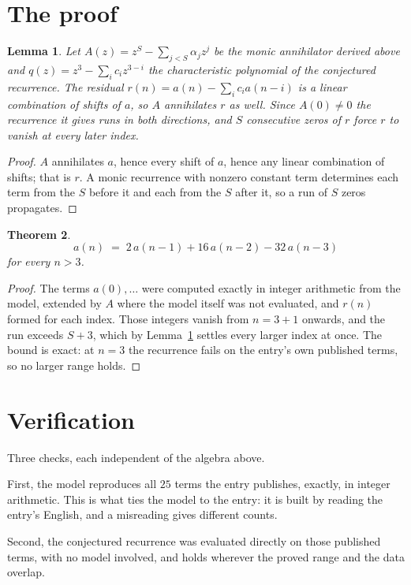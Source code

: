 \documentclass[11pt,a4paper]{article}
\theoremstyle{plain}
\newtheorem{theorem}{Theorem}
\newtheorem{lemma}[theorem]{Lemma}
\theoremstyle{definition}
\begin{document}
\section{The proof}

\begin{lemma}\label{lem:crit}
Let $A(z)=z^S-\sum_{j<S}\alpha_jz^{j}$ be the monic annihilator derived above and
$q(z)=z^{3}-\sum_ic_iz^{3-i}$ the characteristic polynomial of the conjectured
recurrence. The residual $r(n)=a(n)-\sum_ic_ia(n-i)$ is a linear combination of shifts of $a$,
so $A$ annihilates $r$ as well. Since $A(0)\ne0$ the recurrence it gives runs in both
directions, and $S$ consecutive zeros of $r$ force $r$ to vanish at every later index.
\end{lemma}

\begin{proof}
$A$ annihilates $a$, hence every shift of $a$, hence any linear combination of shifts; that is
$r$. A monic recurrence with nonzero constant term determines each term from the $S$ before it
and each from the $S$ after it, so a run of $S$ zeros propagates.
\end{proof}

\begin{theorem}
\[
a(n)\;=\;2\,a(n-1) + 16\,a(n-2) - 32\,a(n-3)
\]
for every $n>3$.
\end{theorem}

\begin{proof}
The terms $a(0),\dots$ were computed exactly in integer arithmetic from the model, extended by
$A$ where the model itself was not evaluated, and $r(n)$ formed for each index. Those integers
vanish from $n=3+1$ onwards, and the run exceeds $S+3$, which by
Lemma~\ref{lem:crit} settles every larger index at once. The bound is exact: at $n=3$ the recurrence fails on the entry's own published terms, so no larger range holds.
\end{proof}

\section{Verification}

Three checks, each independent of the algebra above.

First, the model reproduces all $25$ terms the entry publishes, exactly, in integer
arithmetic. This is what ties the model to the entry: it is built by reading the entry's
English, and a misreading gives different counts.

Second, the conjectured recurrence was evaluated directly on those published terms, with no
model involved, and holds wherever the proved range and the data overlap.
\end{document}
